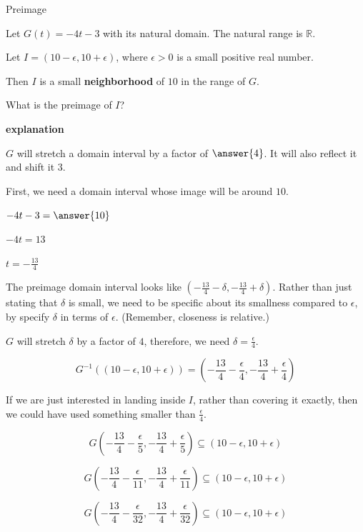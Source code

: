 \documentclass{ximera}
\begin{document}
\begin{example} Preimage

Let $G(t) = -4t - 3$ with its natural domain.  The natural range is $\mathbb{R}$.

Let  $I = (10-\epsilon, 10+\epsilon)$, where $\epsilon > 0$ is a small positive real number.  

Then $I$ is a small \textbf{neighborhood} of $10$ in the range of $G$.


What is the preimage of $I$?

\textbf{\textcolor{red!75!green}{explanation}} 





$G$ will stretch a domain interval by a factor of $\answer{4}$.  It will also reflect it and shift it $3$.  


First, we need a domain interval whose image will be around $10$.

$-4t-3 = \answer{10}$

$-4t = 13$

$t = -\frac{13}{4}$



The preimage domain interval looks like $\left( -\frac{13}{4} - \delta, -\frac{13}{4} + \delta \right)$.  Rather than just stating that $\delta$ is small, we need to be specific about its smallness compared to $\epsilon$, by specify $\delta$ in terms of $\epsilon$. (Remember, closeness is relative.)

$G$ will stretch $\delta$ by a factor of $4$, therefore,  we need $\delta = \frac{\epsilon}{4}$. 




\[   G^{-1}((10-\epsilon, 10+\epsilon)) = \left( -\frac{13}{4} - \frac{\epsilon}{4}, -\frac{13}{4} + \frac{\epsilon}{4} \right)   \]






If we are just interested in landing inside $I$, rather than covering it exactly, then we could have used something smaller than $\frac{\epsilon}{4}$.



\[    
G\left( -\frac{13}{4} - \frac{\epsilon}{5}, -\frac{13}{4} + \frac{\epsilon}{5} \right) \subseteq (10-\epsilon, 10+\epsilon)
\]


\[    
G\left( -\frac{13}{4} - \frac{\epsilon}{11}, -\frac{13}{4} + \frac{\epsilon}{11} \right) \subseteq (10-\epsilon, 10+\epsilon)
\]

\[    
G\left( -\frac{13}{4} - \frac{\epsilon}{32}, -\frac{13}{4} + \frac{\epsilon}{32} \right) \subseteq (10-\epsilon, 10+\epsilon)
\]












\end{example}
\end{document}
